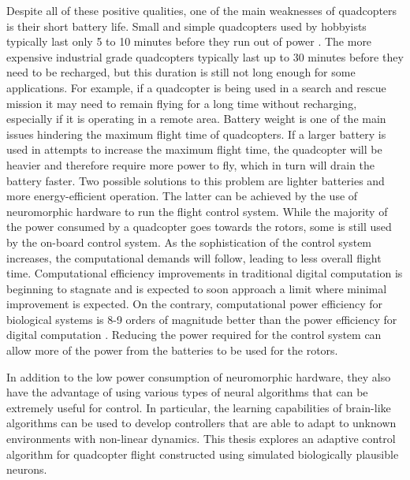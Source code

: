 \documentclass[letterpaper,12pt,titlepage,oneside,final]{book}
\begin{document}
Despite all of these positive qualities, one of the main weaknesses of quadcopters is their short battery life. 
Small and simple quadcopters used by hobbyists typically last only 5 to 10 minutes before they run out of power \cite{batterylife}. 
The more expensive industrial grade quadcopters typically last up to 30 minutes before they need to be recharged, but this duration is still not long enough for some applications. 
For example, if a quadcopter is being used in a search and rescue mission it may need to remain flying for a long time without recharging, especially if it is operating in a remote area. 
Battery weight is one of the main issues hindering the maximum flight time of quadcopters. 
If a larger battery is used in attempts to increase the maximum flight time, the quadcopter will be heavier and therefore require more power to fly, which in turn will drain the battery faster. 
Two possible solutions to this problem are lighter batteries and more energy-efficient operation.
The latter can be achieved by the use of neuromorphic hardware to run the flight control system.
While the majority of the power consumed by a quadcopter goes towards the rotors, some is still used by the on-board control system.
As the sophistication of the control system increases, the computational demands will follow, leading to less overall flight time.
Computational efficiency improvements in traditional digital computation is beginning to stagnate and is expected to soon approach a limit where minimal improvement is expected.
On the contrary, computational power efficiency for biological systems is 8-9 orders of magnitude better than the power efficiency for digital computation \cite{hasler2013finding}.
Reducing the power required for the control system can allow more of the power from the batteries to be used for the rotors.


In addition to the low power consumption of neuromorphic hardware, they also have the advantage of using various types of neural algorithms that can be extremely useful for control.
In particular, the learning capabilities of brain-like algorithms can be used to develop controllers that are able to adapt to unknown environments with non-linear dynamics. 
This thesis explores an adaptive control algorithm for quadcopter flight constructed using simulated biologically plausible neurons.
\end{document}
